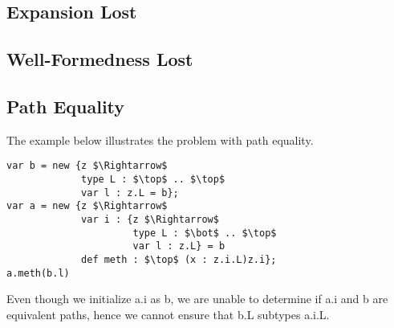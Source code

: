 \documentclass{llncs}
\begin{document}
\subsection{Expansion Lost}
\subsection{Well-Formedness Lost}

\subsection{Path Equality}
The example below illustrates the problem with path equality.
\begin{lstlisting}[mathescape, style=custom_lang]
var b = new {z $\Rightarrow$
             type L : $\top$ .. $\top$
             var l : z.L = b};
var a = new {z $\Rightarrow$
             var i : {z $\Rightarrow$
                      type L : $\bot$ .. $\top$
                      var l : z.L} = b
             def meth : $\top$ (x : z.i.L)z.i};
a.meth(b.l)
\end{lstlisting}
Even though we initialize a.i as b, we are unable to determine if
a.i and b are equivalent paths, hence we cannot ensure that b.L subtypes 
a.i.L.
\end{document}
